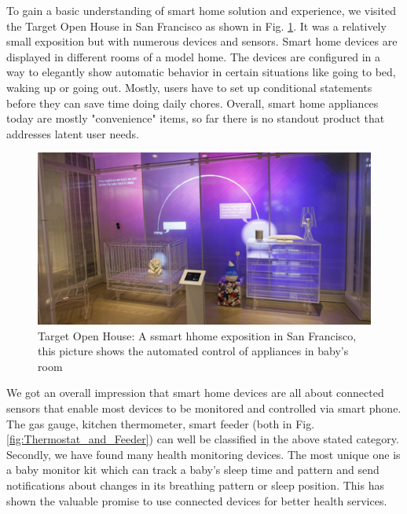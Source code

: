 

To gain a basic understanding of smart home solution and experience, we visited the Target Open House in San Francisco as shown in Fig. \ref{fig:OpenHouse_connect}. It was a relatively small exposition but with numerous devices and sensors. Smart home devices are displayed in different rooms of a model home. The devices are configured in a way to elegantly show automatic behavior in certain situations like going to bed, waking up or going out. Mostly, users have to set up conditional statements before they can save time doing daily chores. Overall, smart home appliances today are mostly "convenience" items, so far there is no standout product that addresses latent user needs.

\begin{figure}[ht]
\centering
	\includegraphics[keepaspectratio, width=5in]{Figures/BenchmarkingOld/OpenHouse_Scene.jpg}
	\caption{Target Open House: A ssmart hhome exposition in San Francisco, this picture shows the automated control of appliances in baby's room}
	\label{fig:OpenHouse_connect}
\end{figure}

We got an overall impression that smart home devices are all about connected sensors that enable most devices to be monitored and controlled via smart phone. The gas gauge, kitchen thermometer, smart feeder (both in Fig. \ref{fig:Thermostat_and_Feeder}) can well be classified in the above stated category. 
Secondly, we have found many health monitoring devices. The most unique one is a baby monitor kit which can track a baby's sleep time and pattern and send notifications about changes in its breathing pattern or sleep position. This has shown the valuable promise to use connected devices for better health services.

